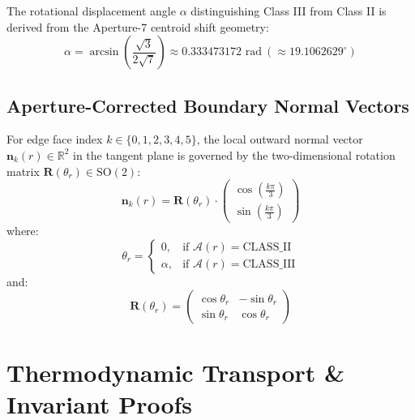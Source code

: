\documentclass[10pt,journal,compsoc]{IEEEtran}
\begin{document}
The rotational displacement angle $\alpha$ distinguishing Class III from Class II is derived from the Aperture-7 centroid shift geometry:
\begin{equation}
\alpha = \arcsin\left( \frac{\sqrt{3}}{2\sqrt{7}} \right) \approx 0.333473172 \text{ rad} \ (\approx 19.1062629^\circ)
\end{equation}

\subsection{Aperture-Corrected Boundary Normal Vectors}
For edge face index $k \in \{0, 1, 2, 3, 4, 5\}$, the local outward normal vector $\mathbf{n}_k(r) \in \mathbb{R}^2$ in the tangent plane is governed by the two-dimensional rotation matrix $\mathbf{R}(\theta_r) \in \mathrm{SO}(2)$:
\begin{equation}
\mathbf{n}_k(r) = \mathbf{R}(\theta_r) \cdot \begin{pmatrix} \cos\left( \frac{k\pi}{3} \right) \\ \sin\left( \frac{k\pi}{3} \right) \end{pmatrix}
\end{equation}
where:
\begin{equation}
\theta_r = \begin{cases}
0, & \text{if } \mathcal{A}(r) = \text{CLASS\_II} \\
\alpha, & \text{if } \mathcal{A}(r) = \text{CLASS\_III}
\end{cases}
\end{equation}
and:
\begin{equation}
\mathbf{R}(\theta_r) = \begin{pmatrix} \cos\theta_r & -\sin\theta_r \\ \sin\theta_r & \cos\theta_r \end{pmatrix}
\end{equation}

\section{Thermodynamic Transport \& Invariant Proofs}
\end{document}
